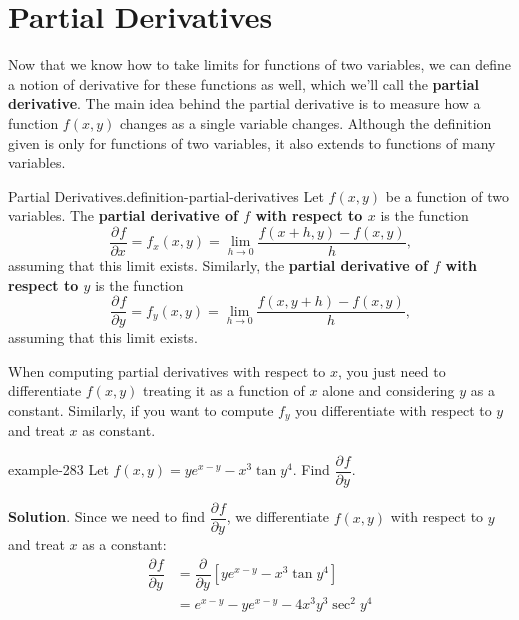 \documentclass[10pt,]{book}
\newcommand{\terminology}[1]{\textbf{#1}}
\numberwithin{equation}{section}
\newcommand{\pdv}[3][]{\dfrac{\partial^{#1} #2}{\partial #3^{#1}}}
\begin{document}
\section[{Partial Derivatives}]{Partial Derivatives}\label{section-partial-derivatives}
Now that we know how to take limits for functions of two variables, we can define a notion of derivative for these functions as well, which we'll call the \terminology{partial derivative}. The main idea behind the partial derivative is to measure how a function \(f(x,y)\) changes as a single variable changes. Although the definition given is only for functions of two variables, it also extends to functions of many variables.\begin{definition}{Partial Derivatives.}{definition-partial-derivatives}%
\hypertarget{p-1354}{}%
Let \(f(x,y)\) be a function of two variables. The \terminology{partial derivative of \(f\) with respect to \(x\)} is the function%
\begin{equation*}
\pdv{f}{x} = f_{x}(x,y) = \lim_{h\to0}\frac{f(x+h,y)-f(x,y)}{h}\text{,}
\end{equation*}
assuming that this limit exists. Similarly, the \terminology{partial derivative of \(f\) with respect to \(y\)} is the function%
\begin{equation*}
\pdv{f}{y} = f_{y}(x,y) = \lim_{h\to0}\frac{f(x,y+h)-f(x,y)}{h}\text{,}
\end{equation*}
assuming that this limit exists.%
\end{definition}
\hypertarget{p-1355}{}%
When computing partial derivatives with respect to \(x\), you just need to differentiate \(f(x,y)\) treating it as a function of \(x\) alone and considering \(y\) as a constant. Similarly, if you want to compute \(f_{y}\) you differentiate with respect to \(y\) and treat \(x\) as constant.%
\begin{example}{}{example-283}%
\hypertarget{p-1356}{}%
Let \(f(x,y) = ye^{x-y} - x^{3}\tan y^{4}\). Find \(\pdv{f}{y}\).%
\par\smallskip%
\noindent\textbf{Solution}.\hypertarget{solution-217}{}\quad%
\hypertarget{p-1357}{}%
Since we need to find \(\pdv{f}{y}\), we differentiate \(f(x,y)\) with respect to \(y\) and treat \(x\) as a constant:%
\begin{align*}
\pdv{f}{y} & = \pdv{}{y}\left[ye^{x-y} - x^{3}\tan y^{4}\right] \\
& = e^{x-y} - ye^{x-y} - 4x^{3}y^{3}\sec^{2}y^{4} 
\end{align*}
%
\end{example}
\end{document}
